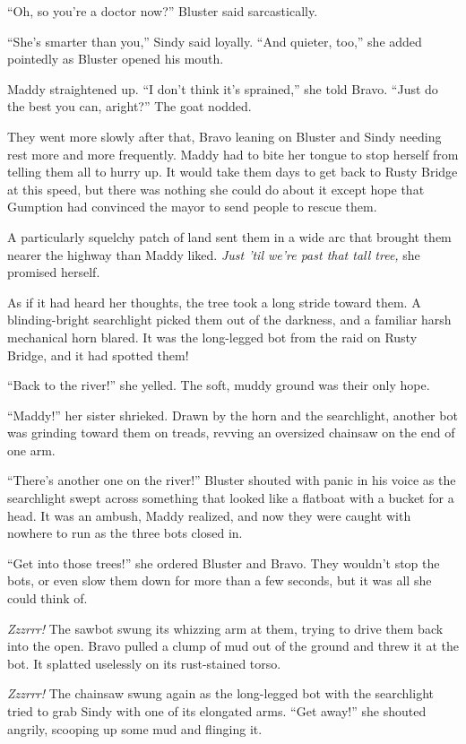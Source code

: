 \documentclass[10pt]{article}
\begin{document}
``Oh, so you're a doctor now?'' Bluster said sarcastically.

``She's smarter than you,'' Sindy said loyally. ``And quieter, too,''
she added pointedly as Bluster opened his mouth.

Maddy straightened up. ``I don't think it's sprained,'' she told Bravo.
``Just do the best you can, aright?'' The goat nodded.

They went more slowly after that, Bravo leaning on Bluster and Sindy
needing rest more and more frequently. Maddy had to bite her tongue to
stop herself from telling them all to hurry up. It would take them days
to get back to Rusty Bridge at this speed, but there was nothing she
could do about it except hope that Gumption had convinced the mayor to
send people to rescue them.

A particularly squelchy patch of land sent them in a wide arc that
brought them nearer the highway than Maddy liked. \emph{Just 'til we're
past that tall tree,} she promised herself.

As if it had heard her thoughts, the tree took a long stride toward
them. A blinding-bright searchlight picked them out of the darkness, and
a familiar harsh mechanical horn blared. It was the long-legged bot from
the raid on Rusty Bridge, and it had spotted them!

``Back to the river!'' she yelled. The soft, muddy ground was their only
hope.

``Maddy!'' her sister shrieked. Drawn by the horn and the searchlight,
another bot was grinding toward them on treads, revving an oversized
chainsaw on the end of one arm.

``There's another one on the river!'' Bluster shouted with panic in his
voice as the searchlight swept across something that looked like a
flatboat with a bucket for a head. It was an ambush, Maddy realized, and
now they were caught with nowhere to run as the three bots closed in.

``Get into those trees!'' she ordered Bluster and Bravo. They wouldn't
stop the bots, or even slow them down for more than a few seconds, but
it was all she could think of.

\emph{Zzzrrr!} The sawbot swung its whizzing arm at them, trying to
drive them back into the open. Bravo pulled a clump of mud out of the
ground and threw it at the bot. It splatted uselessly on its
rust-stained torso.

\emph{Zzzrrr!} The chainsaw swung again as the long-legged bot with the
searchlight tried to grab Sindy with one of its elongated arms. ``Get
away!'' she shouted angrily, scooping up some mud and flinging it.
\end{document}
